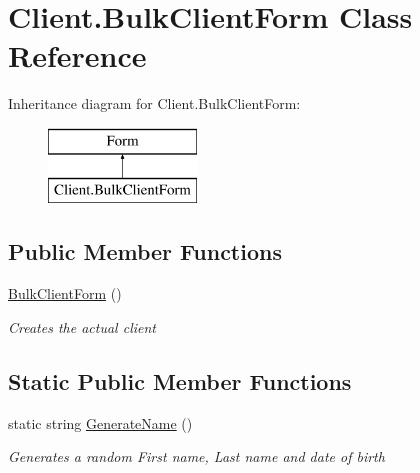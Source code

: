 \hypertarget{class_client_1_1_bulk_client_form}{}\section{Client.\+Bulk\+Client\+Form Class Reference}
\label{class_client_1_1_bulk_client_form}
Inheritance diagram for Client.\+Bulk\+Client\+Form\+:\begin{figure}[H]
\begin{center}
\leavevmode
\includegraphics[height=2.000000cm]{class_client_1_1_bulk_client_form}
\end{center}
\end{figure}
\subsection*{Public Member Functions}
\begin{DoxyCompactItemize}
\item 
\mbox{\hyperlink{class_client_1_1_bulk_client_form_a04bd4b85e81d89abe705730c898659a5}{Bulk\+Client\+Form}} ()
\begin{DoxyCompactList}\small\item\em Creates the actual client \end{DoxyCompactList}\end{DoxyCompactItemize}
\subsection*{Static Public Member Functions}
\begin{DoxyCompactItemize}
\item 
static string \mbox{\hyperlink{class_client_1_1_bulk_client_form_a14a353ff4bb98da49fb665a02108aab4}{Generate\+Name}} ()
\begin{DoxyCompactList}\small\item\em Generates a random First name, Last name and date of birth \end{DoxyCompactList}\end{DoxyCompactItemize}

